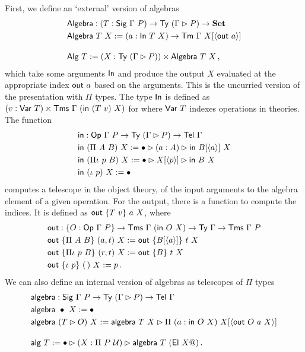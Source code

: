 First, we define an `external' version of algebras
\begin{align*}
    &\mta{Algebra} : (T : \mta{Sig}\ \Gamma\ P) \to \Ty\ (\Gamma \rhd P) \to \Set \\
    &\mta{Algebra}\ T\ X := (a : \mta{In}\ T\ X) \to \Tm\ \Gamma\ X[\Msub{\mta{out}\ a}] \\[1em]
    &\mta{Alg}\ T := (X : \Ty\ (\Gamma \rhd P)) \times \mta{Algebra}\ T\ X \,,
\end{align*}
which take some arguments $\textsf{In}$ and produce the output $X$
evaluated at the appropriate index $\mta{out}\ a$ based on the arguments.
This is the uncurried version of the presentation with $\Pi$ types.
The type $\textsf{In}$ is defined as $(v : \textsf{Var}\ T) \times \textsf{Tms}\ \Gamma\
(\textsf{in}\ (T\ v)\ X)$ for where $\textsf{Var}\ T$ indexes
operations in theories. The function
\begin{align*}
    &\mta{in} : \mta{Op}\ \Gamma\ P \to \Ty\ (\Gamma \rhd P) \to \Tel\ \Gamma \\
    &\mta{in}\ (\Pi\ A\ B)\ X := \bullet \rhd (a : A) \rhd \mta{in}\ B[\Msub a]\ X \\
    &\mta{in}\ (\Pi\iota\ p\ B)\ X := \bullet \rhd X[\Msub p] \rhd \mta{in}\ B\ X \\
    &\mta{in}\ (\iota\ p)\ X := \bullet \,
\end{align*}
computes a telescope in the object theory, of the input arguments to the algebra
element of a given operation. For the output, there is a function to compute
the indices. It is defined as $\textsf{out}\ \{T\ v\}\ a\ X$, where
\begin{align*}
    &\mta{out} : \{O : \Op\ \Gamma\ P\} \to \Tms\ \Gamma\ (\mta{in}\ O\ X) \to \Ty\ \Gamma \to \Tms\ \Gamma\ P \\
    &\mta{out}\ \{\Pi\ A\ B\}\ (a, t)\ X := \mta{out}\ \{B[\Msub a]\}\ t\ X \\
    &\mta{out}\ \{\Pi\iota\ p\ B\}\ (r, t)\ X := \mta{out}\ \{B\}\ t\ X \\
    &\mta{out}\ \{\iota\ p\}\ (\,)\ X := p \,.
\end{align*}
We can also define an internal version of algebras as telescopes of $\Pi$ types
\begin{align*}
    &\mta{algebra} : \mta{Sig}\ \Gamma\ P \to \Ty\ (\Gamma \rhd P) \to \Tel\ \Gamma \\
    &\mta{algebra}\ \bullet\ X := \bullet \\
    &\mta{algebra}\ (T \rhd O)\ X := \mta{algebra}\ T\ X \rhd \Pi\ (a : \mta{in}\ O\ X)\ X[\Msub{\mta{out}\ O\ a\ X}] \\[1em]
    &\mta{alg}\ T := \bullet \rhd (X : \Pi\ P\ \univ) \rhd \mta{algebra}\ T\ (\mta{El}\ X@)  \,.
\end{align*}

